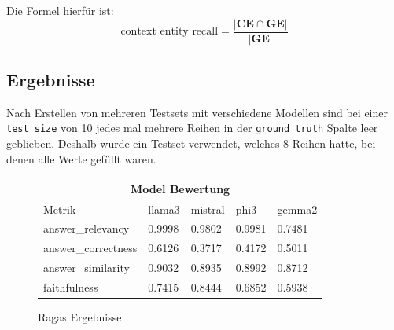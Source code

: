 Die Formel hierfür ist: 
\[\text{context entity recall} = \frac{|\mathbf{CE}\cap\mathbf{GE}|}{|\mathbf{GE}|}\]
\fi

\subsection{Ergebnisse}
\label{s:bew}
Nach Erstellen von mehreren Testsets mit verschiedene 
Modellen sind bei einer \verb|test_size| von 10 jedes mal 
mehrere Reihen in der \verb|ground_truth| Spalte leer geblieben.
Deshalb wurde ein Testset verwendet, welches 8 Reihen hatte, bei
denen alle Werte gefüllt waren.\par

\par

\begin{center}
    \begin{figure}
        
    
    \begin{tabular}{ |p{3.5cm}||p{2cm}|p{2cm}|p{2cm}|p{2cm}| }
        \hline
        \multicolumn{5}{|c|}{Model Bewertung} \\
        \hline
        Metrik & llama3 & mistral & phi3 & gemma2 \\
        \hline
        answer\_relevancy   & 0.9998   & 0.9802 &  0.9981 & 0.7481\\
        answer\_correctness & 0.6126  & 0.3717  &  0.4172 & 0.5011\\
        answer\_similarity & 0.9032 & 0.8935    &  0.8992 & 0.8712\\
        faithfulness &   0.7415  & 0.8444       &  0.6852 & 0.5938\\
        \hline

       \end{tabular}
       \caption{Ragas Ergebnisse}
       \label{tab:evaluation}
    \end{figure}
\end{center}

